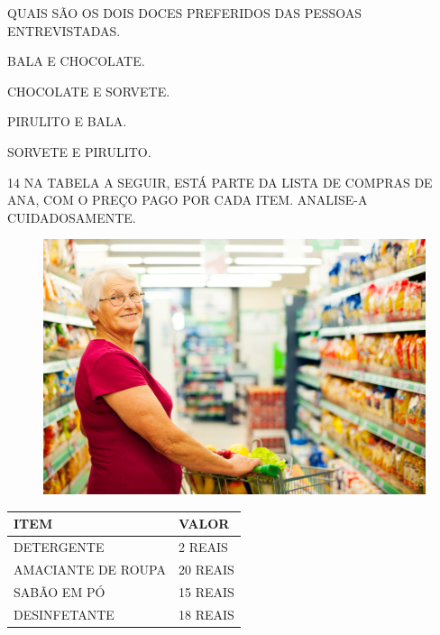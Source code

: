 QUAIS SÃO OS DOIS DOCES PREFERIDOS DAS PESSOAS ENTREVISTADAS.

\begin{escolha}%
\item BALA E CHOCOLATE.

\item CHOCOLATE E SORVETE.

\item PIRULITO E BALA.

\item SORVETE E PIRULITO.
\end{escolha}

\num{14} NA TABELA A SEGUIR, ESTÁ PARTE DA LISTA DE COMPRAS DE ANA, COM O PREÇO PAGO POR CADA ITEM. ANALISE-A CUIDADOSAMENTE.

\begin{figure}[H]
\includegraphics[width=\textwidth]{./media/image117.png}
\end{figure}

\begin{table}[H]
    \centering
    \begin{tabular}{|l|l|}
    \hline
        \large\textbf{ITEM} & \large\textbf{VALOR} \\ \hline
        \large{DETERGENTE} & \large{2 REAIS} \\ \hline
        \large{AMACIANTE DE ROUPA} & \large{20 REAIS} \\ \hline
        \large{SABÃO EM PÓ} & \large{15 REAIS} \\ \hline
        \large{DESINFETANTE} & \large{18 REAIS} \\ \hline
    \end{tabular}
\end{table}

